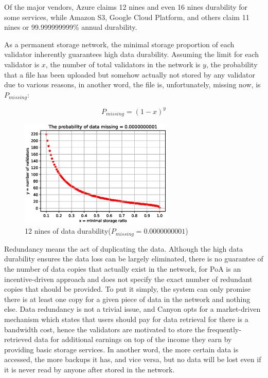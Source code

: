\documentclass[]{article}
\newcounter{subsubsubsection}[subsubsection]
\begin{document}
Of the major vendors, Azure claims 12 nines and even 16 nines durability for some services, while Amazon S3, Google Cloud Platform, and others claim 11 nines or 99.999999999\% annual durability.

As a permanent storage network, the minimal storage proportion of each validator inherently guarantees high data durability. Assuming the limit for each validator is $x$, the number of total validators in the network is $y$, the probability that a file has been uploaded but somehow actually not stored by any validator due to various reasons, in another word, the file is, unfortunately, missing now, is $P_{missing}$:

$$
P_{missing} = (1-x)^y
$$

\begin{figure}[H]
\centering
\includegraphics[width=0.65\textwidth]{P_data_missing}
  \caption{12 nines of data durability($P_{missing} = 0.0000000001$)}
\label{Fig.P_data_missing}
\end{figure}


Redundancy means the act of duplicating the data. Although the high data durability ensures the data loss can be largely eliminated, there is no guarantee of the number of data copies that actually exist in the network, for PoA is an incentive-driven approach and does not specify the exact number of redundant copies that should be provided. To put it simply, the system can only promise there is at least one copy for a given piece of data in the network and nothing else. Data redundancy is not a trivial issue, and Canyon opts for a market-driven mechanism which states that users should pay for data retrieval for there is a bandwidth cost, hence the validators are motivated to store the frequently-retrieved data for additional earnings on top of the income they earn by providing basic storage services. In another word, the more certain data is accessed, the more backups it has, and vice versa, but no data will be lost even if it is never read by anyone after stored in the network.
\end{document}
